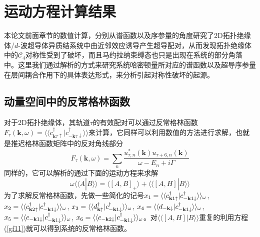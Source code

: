 \section{运动方程计算结果}
本论文前面章节的数值计算，分别从谱函数以及序参量的角度研究了2D拓扑绝缘体/$d$-波超导体异质结系统中由近邻效应诱导产生超导配对，从而发现拓扑绝缘体中的$\mathcal{C}_4$对称性受到了破坏，而且马约拉纳束缚态也只是出现在系统的部分角落中。这里我们通过解析的方式来研究系统哈密顿量所对应的谱函数以及超导序参量在层间耦合作用下的具体表达形式，来分析引起对称性破坏的起源。
\subsection{动量空间中的反常格林函数}
对于2D拓扑绝缘体，其轨道$\tau$的有效配对可以通过反常格林函数$F_\tau(\mathbf{k},\omega)=\langle\langle c^\dagger_{\mathbf{k}\tau\uparrow}|c^\dagger_{\mathbf{-k}\tau\downarrow}\rangle\rangle$来计算，它同样可以利用数值的方法进行求解，也就是推迟格林函数矩阵中的反对角线部分
\begin{equation}
F_\tau(\mathbf{k},\omega)=\sum_n\frac{u^{*}_{\tau,n}(\mathbf{k})u_{\tau+6,n}(\mathbf{k})}{\omega-E_n+i\Gamma}\label{af1}
\end{equation}
同样的，它可以解析的通过下面的运动方程来求解
\begin{equation}
\omega\langle\langle A|B\rangle\rangle=\langle\left[A,B\right]_{+}\rangle+\langle\langle\left[A,H\right]|B\rangle\rangle\label{gf11}
\end{equation}
为了求解反常格林函数，先做一些简化的记号$x_1=\langle\langle c_{{\bf k}1\uparrow}^\dagger|c_{-{\bf k}1\downarrow}^\dagger\rangle\rangle_\omega$,
$x_2 = \langle\langle c_{{\bf k}2\uparrow}^\dagger|c_{-{\bf k}1\downarrow}^\dagger\rangle\rangle_\omega$,
$x_3 = \langle\langle d_{{\bf k}\uparrow}^\dagger|c_{-{\bf k}1\downarrow}^\dagger\rangle\rangle_\omega$,
$x_4 = \langle\langle d_{-{\bf k}\downarrow}|c_{-{\bf k}1\downarrow}^\dagger\rangle\rangle_\omega$,
$x_5 = \langle\langle c_{-{\bf k}1\downarrow}|c_{-{\bf k}1\downarrow}^\dagger\rangle\rangle_\omega$,
$x_6 = \langle\langle c_{-{\bf k}2\downarrow}|c_{-{\bf k}1\downarrow}^\dagger\rangle\rangle_\omega$。对$\langle\langle\left[A,H\right]|B\rangle\rangle$重复的利用方程(\ref{gf11})就可以得到系统的反常格林函数。

